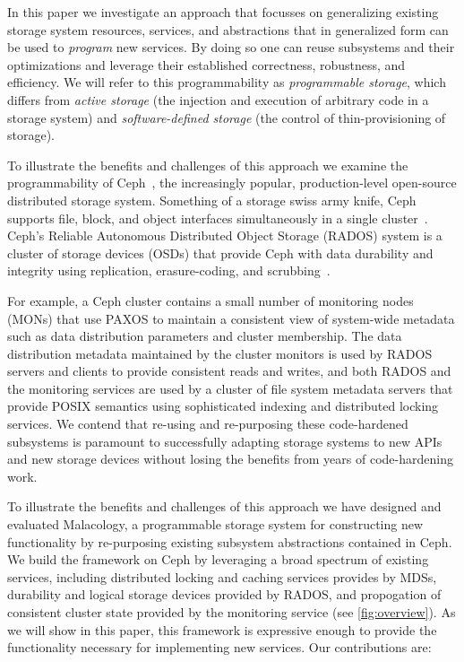 \documentclass[10pt,twocolumn]{article}
\begin{document}
In this paper we investigate an approach that focusses on generalizing
existing storage system resources, services, and abstractions that in
generalized form can be used to \emph{program} new services. By doing so
one can reuse subsystems and their optimizations and leverage their
established correctness, robustness, and efficiency. We will refer to
this programmability as \emph{programmable storage}, which differs from
\emph{active storage} (the injection and execution of arbitrary code in
a storage system) and \emph{software-defined storage} (the control of
thin-provisioning of storage).

To illustrate the benefits and challenges of this approach we examine
the programmability of Ceph~\cite{weil_ceph_2006}, the increasingly
popular, production-level open-source distributed storage system.
Something of a storage swiss army knife, Ceph supports file, block, and
object interfaces simultaneously in a single cluster~\cite{ceph_contributors_ceph_2010}. Ceph's Reliable Autonomous 
Distributed Object Storage (RADOS) system is a cluster of storage
devices (OSDs) that provide Ceph with data durability and integrity
using replication, erasure-coding, and scrubbing~\cite{weil_rados_2007}. 


For example, a Ceph cluster contains a small number of
monitoring nodes (MONs) that use PAXOS to maintain a consistent view of
system-wide metadata such as data distribution parameters and cluster
membership. The data distribution metadata maintained by
the cluster monitors is used by RADOS servers and clients to provide
consistent reads and writes, and both RADOS and the monitoring services
are used by a cluster of file system metadata servers that provide POSIX
semantics using sophisticated indexing and distributed locking services.
We contend that re-using and re-purposing these code-hardened subsystems
is paramount to successfully adapting storage systems to new APIs and
new storage devices without losing the benefits from years of
code-hardening work.

To illustrate the benefits and challenges of this approach we have
designed and evaluated Malacology, a programmable storage system for
constructing new functionality by re-purposing existing subsystem
abstractions contained in Ceph. We build the framework on Ceph by
leveraging a broad spectrum of existing services, including distributed
locking and caching services provides by MDSs, durability and logical
storage devices provided by RADOS, and propogation of consistent cluster
state provided by the monitoring service (see \ref{fig:overview}). As we will show in this paper, this framework is expressive enough to provide the
functionality necessary for implementing new services. Our contributions
are:
\end{document}
